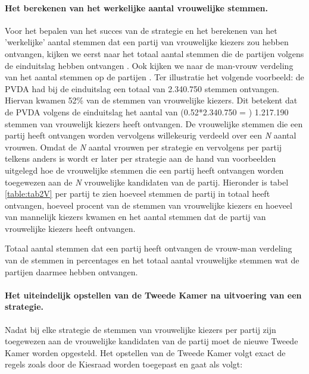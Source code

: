 \newpage
\paragraph{Het berekenen van het werkelijke aantal vrouwelijke stemmen.}
Voor het bepalen van het succes van de strategie en het berekenen van het 'werkelijke' aantal stemmen dat een partij van vrouwelijke kiezers zou hebben ontvangen, kijken we eerst naar het totaal aantal stemmen die de partijen volgens de einduitslag hebben ontvangen \citep{Kiesraad_uitslag}. Ook kijken we naar de man-vrouw verdeling van het aantal stemmen op de partijen \citep{IPSOS_man_vrouw}. Ter illustratie het volgende voorbeeld: de PVDA had bij de einduitslag een totaal van 2.340.750 stemmen ontvangen. Hiervan kwamen 52\% van de stemmen van vrouwelijke kiezers. Dit betekent dat de PVDA volgens de einduitslag het aantal van (0.52*2.340.750 = ) 1.217.190 stemmen van vrouwelijk kiezers heeft ontvangen. De vrouwelijke stemmen die een partij heeft ontvangen worden vervolgens willekeurig verdeeld over een \textit{N}  aantal vrouwen. Omdat de \textit{N} aantal vrouwen per strategie en vervolgens per partij telkens anders is wordt er later per strategie aan de hand van voorbeelden uitgelegd hoe de vrouwelijke stemmen die een partij heeft ontvangen worden toegewezen aan de \textit{N} vrouwelijke kandidaten van de partij. Hieronder is tabel \ref{table:tab2V} per partij te zien hoeveel stemmen de partij in totaal heeft ontvangen, hoeveel procent van de stemmen van vrouwelijke kiezers en hoeveel van mannelijk kiezers kwamen en het aantal stemmen dat de partij van vrouwelijke kiezers heeft ontvangen. 


\begin{table}[h]
\centering
	\begin{footnotesize}
		
	\end{footnotesize}

			\caption{Totaal aantal stemmen dat een partij heeft ontvangen \citep{Kiesraad_databank} de vrouw-man verdeling van de stemmen in percentages \citep{IPSOS_man_vrouw} en het totaal aantal vrouwelijke stemmen wat de partijen daarmee hebben ontvangen.}
\label{table:tab2V} 
\end{table}




\paragraph{Het uiteindelijk opstellen van de Tweede Kamer na uitvoering van een strategie.}
Nadat bij elke strategie de stemmen van vrouwelijke kiezers per partij zijn toegewezen aan de vrouwelijke kandidaten van de partij moet de nieuwe Tweede Kamer worden opgesteld. Het opstellen van de Tweede Kamer volgt exact de regels
zoals door de Kiesraad \citeyearpar{Kiesraad_voorkeursdrempel2}  worden toegepast
en gaat als volgt: 

